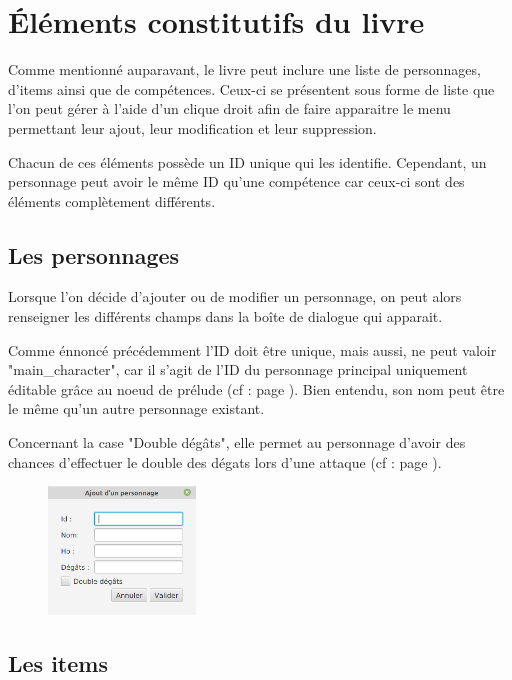 \chapter{Éléments constitutifs du livre}

	\label{chapter:elementsConstitutifLivre}
	Comme mentionné auparavant, le livre peut inclure une liste de personnages, d'items ainsi que de compétences. Ceux-ci se présentent sous forme de liste que l'on peut gérer à l'aide d'un clique droit afin de faire apparaitre le menu permettant leur ajout, leur modification et leur suppression.

	Chacun de ces éléments possède un ID unique qui les identifie. Cependant, un personnage peut avoir le même ID qu'une compétence car ceux-ci sont des éléments complètement différents.

	\section{Les personnages}
		\label{sec:perso}

		Lorsque l'on décide d'ajouter ou de modifier un personnage, on peut alors renseigner les différents champs dans la boîte de dialogue qui apparait.

		Comme énnoncé précédemment l'ID doit être unique, mais aussi, ne peut valoir "main\_character", car il s'agit de l'ID du personnage principal uniquement éditable grâce au noeud de prélude (cf :  page \pageref{subsec:main_character}). Bien entendu, son nom peut être le même qu'un autre personnage existant.

		Concernant la case "Double dégâts", elle permet au personnage d'avoir des chances d'effectuer le double des dégats lors d'une attaque (cf :  page \pageref{subsubsec:combat}).

		\begin{figure}[H]
			\centering\includegraphics[width=0.35\textwidth, keepaspectratio]{img/personnageDialog.png}
		\end{figure}

	\section{Les items}


